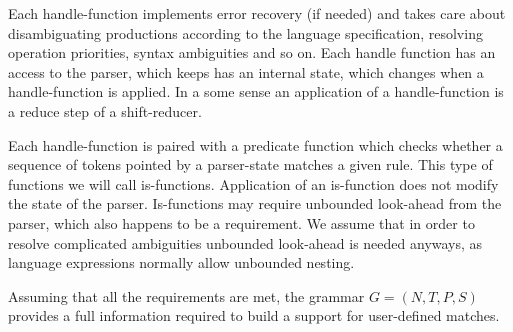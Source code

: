Each handle-function implements error recovery (if needed) and takes
care about disambiguating productions according to the language
specification, resolving operation priorities, syntax ambiguities
and so on.  Each handle function has an access to the parser, which
keeps has an internal state, which changes when a handle-function
is applied.  In a some sense an application of a handle-function
is a reduce step of a shift-reducer.

Each handle-function is paired with a predicate function which checks
whether a sequence of tokens pointed by a parser-state matches a 
given rule.  This type of functions we will call is-functions.
Application of an is-function does not modify the state of
the parser.  Is-functions may require unbounded look-ahead from 
the parser, which also happens to be a requirement.  We assume that in
order to resolve complicated ambiguities unbounded look-ahead is needed
anyways, as language expressions normally allow unbounded nesting.


Assuming that all the requirements are met, the grammar $G = (N, T, P,
S)$ provides a full information required to build a support for
user-defined matches.


